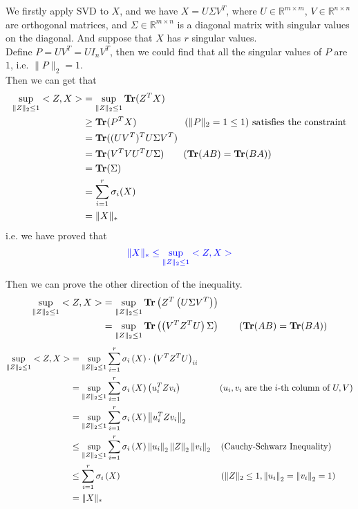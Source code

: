 \begin{itemize}
We firstly apply SVD to $X$, and we have $X=U\Sigma V^T$, where $U\in\mathbb{R}^{m\times m}$, $V\in\mathbb{R}^{n\times n}$ are orthogonal matrices, and $\Sigma\in\mathbb{R}^{m\times n}$ is a diagonal matrix with singular values on the diagonal. And suppose that $X$ has $r$ singular values. \\
Define $P=UV^T=UI_nV^T$, then we could find that all the singular values of $P$ are $1$, i.e. $\|P\|_2=1$. \\
Then we can get that
\begin{align*}
\sup_{\|Z\|_2\leq 1}<Z,X> &= \sup_{\|Z\|_2\leq 1}\mathop{\bf Tr}(Z^TX) \\
&\geq \mathop{\bf Tr}(P^TX) \text{\qquad\qquad\quad ($\|P\|_2=1\leq 1$) satisfies the constraint} \\
&= \mathop{\bf Tr}((UV^T)^TU\Sigma V^T) \\
&= \mathop{\bf Tr}(V^TVU^TU\Sigma) \text{\qquad ($\mathop{\bf Tr}(AB)=\mathop{\bf Tr}(BA)$)} \\
&= \mathop{\bf Tr}(\Sigma) \\
&= \sum_{i=1}^{r}\sigma_i(X) \\
&= \|X\|_*
\end{align*}
i.e. we have proved that
\begin{equation}
\textcolor{blue}{\|X\|_* \leq \sup_{\|Z\|_2 \leq 1} <Z,X>}
\label{eq:leq}
\end{equation}

Then we can prove the other direction of the inequality. \\
\begin{align*}
\sup_{\|Z\|_2 \leq 1} <Z,X> &= \sup_{\|Z\|_2 \leq 1} \mathop{\bf Tr}\left(Z^T\left(U\Sigma V^T\right)\right) \\
&= \sup_{\|Z\|_2 \leq 1} \mathop{\bf Tr}\left(\left(V^TZ^TU\right)\Sigma\right) \text{\qquad ($\mathop{\bf Tr}(AB)=\mathop{\bf Tr}(BA)$)}
\end{align*}
\begin{align*}
\sup_{\|Z\|_2 \leq 1} <Z,X> &= \sup_{\|Z\|_2 \leq 1} \sum_{i=1}^{r}\sigma_i\left(X\right)\cdot\left(V^TZ^TU\right)_{ii} \\
&= \sup_{\|Z\|_2 \leq 1} \sum_{i=1}^{r}\sigma_i\left(X\right)\left(u_i^TZv_i\right) \text{\qquad\qquad\ ($u_i,v_i$ are the $i$-th column of $U,V$)} \\
&= \sup_{\|Z\|_2 \leq 1} \sum_{i=1}^{r}\sigma_i\left(X\right)\left\|u_i^TZv_i\right\|_2 \\
&\leq \sup_{\|Z\|_2 \leq 1} \sum_{i=1}^{r}\sigma_i\left(X\right)\left\|u_i\right\|_2\left\|Z\right\|_2\left\|v_i\right\|_2 \text{\quad (Cauchy-Schwarz Inequality)} \\
&\leq \sum_{i=1}^{r}\sigma_i\left(X\right) \text{\qquad\qquad\qquad\qquad\qquad\quad\ ($\|Z\|_2\leq 1, \left\|u_i\right\|_2=\left\|v_i\right\|_2=1$)} \\
&= \|X\|_*
\end{align*}



\end{itemize}
